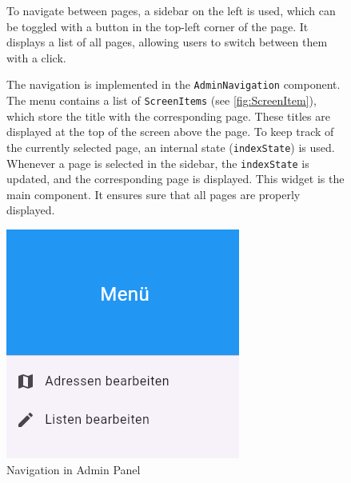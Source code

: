 \begin{figure}[H]

\begin{minipage}{0.58\textwidth}
    To navigate between pages, a sidebar on the left is used, which can be toggled with a button in the top-left corner of the page. It displays a list of all pages, allowing users to switch between them with a click.

    The navigation is implemented in the \texttt{AdminNavigation} component. The menu contains a list of \texttt{ScreenItems} (see \ref{fig:ScreenItem}), which store the title with the corresponding page. These titles are displayed at the top of the screen above the page. To keep track of the currently selected page, an internal state (\texttt{indexState}) is used. Whenever a page is selected in the sidebar, the \texttt{indexState} is updated, and the corresponding page is displayed. This widget is the main component. It ensures sure that all pages are properly displayed.

    \end{minipage}
    \hfill
    \begin{minipage}{0.38\textwidth}
    \centering
    \includegraphics[width=\linewidth]{images/AdminPanel/Menu.png}
    \caption{Navigation in Admin Panel}
    \label{fig:adminpanel_navigation}
\end{minipage}

\end{figure}

